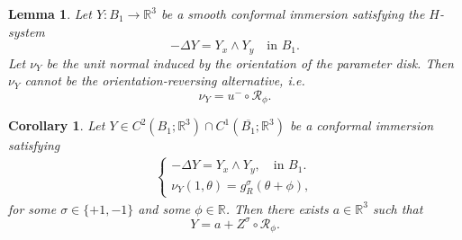 \documentclass[10pt,a4paper]{amsart}
\newtheorem{corollary}{Corollary}
\newtheorem{lemma}{Lemma}
\newcommand{\B}{B_1}
\newcommand{\RR}{\mathbb R}
\newcommand{\Rot}{\mathcal R}
\begin{document}
\begin{lemma}\label{reverseimpossible}
Let $Y:B_1\to\mathbb R^3$ be a smooth conformal immersion satisfying the
$H$-system
\[
 -\Delta Y=Y_x\wedge  Y_y \quad\text{in }B_1.
\]
Let $\nu_Y$
be the unit normal induced by the orientation of the parameter disk.  Then  $\nu_Y$ cannot be
 the orientation-reversing alternative, i.e.
\[
 \nu_Y=u^-\circ\mathcal R_\phi.
\]
\end{lemma}

\begin{corollary}\label{cor:normal-trace-Hsystem}
Let $Y\in C^2(\B;\RR^3)\cap C^1(\overline{\B};\RR^3)$ be a conformal immersion satisfying
\begin{align*}\displaystyle
\begin{cases}
        -\Delta Y=Y_x\wedge Y_y,\quad\text{in }\B.\\
        \nu_Y(1,\theta)=g_R^\sigma(\theta+\phi),
\end{cases}
\end{align*}
for some $\sigma\in\{+1,-1\}$ and some $\phi\in\RR$.
Then there exists $a\in\RR^3$ such that
\[
Y=a+Z^\sigma\circ\Rot_\phi.
\]
\end{corollary}
\end{document}
